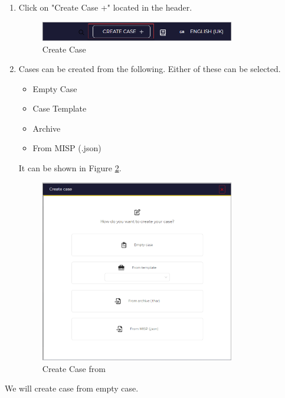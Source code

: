 \documentclass{article}
\begin{document}
\begin{enumerate}
  \item Click on "Create Case +" located in the header.

\begin{figure}[H]
    \centering
    \includegraphics[width=0.8\textwidth]{img18.png}
    \caption{Create Case}
    \label{fig:createcase}
\end{figure}

  \item Cases can be created from the following. Either of these can be selected.
\begin{itemize}
    \item Empty Case
    \item Case Template
    \item Archive
    \item From MISP (.json)

\end{itemize}

It can be shown in Figure \ref{fig:casefrom}.
\begin{figure}[H]
    \centering
    \includegraphics[width=0.8\textwidth]{img19.png}
    \caption{Create Case from}
    \label{fig:casefrom}
\end{figure}

\end{enumerate}
We will create case from empty case.\\
\end{document}
